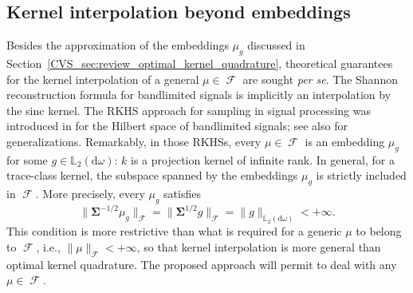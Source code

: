 \documentclass[twoside,11pt]{book}
\numberwithin{theorem}{chapter}
\numberwithin{definition}{chapter}
\numberwithin{proposition}{chapter}
\numberwithin{corollary}{chapter}
\numberwithin{example}{chapter}
\numberwithin{lemma}{chapter}
\numberwithin{assumption}{chapter}
\numberwithin{equation}{chapter}
\numberwithin{figure}{chapter}
\DeclareMathOperator{\F}{\mathcal{F}}
\def\Ltwo{\mathbb{L}_{2}(\mathrm{d} \omega)}
\newcommand{\pc}[1]{\textcolor{blue}{#1}}
\begin{document}
\subsection{Kernel interpolation beyond embeddings}\label{CVS_sec:review_kernel_interpolation_beyond_mu}



Besides the approximation of the embeddings $\mu_{g}$ discussed in Section~\ref{CVS_sec:review_optimal_kernel_quadrature}, theoretical guarantees for the kernel interpolation of a general $\mu\in\F$ are sought \emph{per se}. The Shannon reconstruction formula for bandlimited signals \citep{Sha48} is implicitly an interpolation by the sinc kernel.
The RKHS approach for sampling in signal processing was introduced in \citep{Yao67} for the Hilbert space of bandlimited signals;
see also \citep{NaWa91} for generalizations.
Remarkably, in those RKHSs, every $\mu \in \F$ is an embedding $\mu_{g}$ for some $g \in \Ltwo$: $k$ is a projection kernel of infinite rank. In general, for a trace-class kernel, the subspace spanned by the embeddings $\mu_{g}$ is strictly included in $\F$. More precisely, every $\mu_{g}$ satisfies
\begin{equation}
\|\bm{\Sigma}^{-1/2} \mu_{g}\|_{\F} = \|\bm{\Sigma}^{1/2} g\|_{\F} = \|g\|_{\Ltwo} < +\infty. \nonumber
\end{equation}
This condition is more restrictive than what is required for a generic $\mu$ to belong to $\F$, i.e., $\|\mu\|_{\F}< +\infty$, so that kernel interpolation is more general than optimal kernel quadrature. The proposed approach will permit to deal with any $\mu\in\F$.








%
\end{document}
